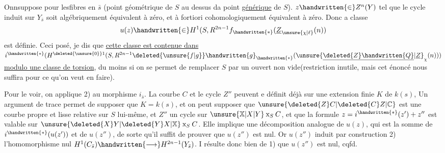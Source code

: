 Onnsuppose   pour lesfibres en $\bar s$ (point géométrique  de $S$ au dessus da point \uline{générique} de $S$).    $z\handwritten{\in}Z^n(Y)$ tel que le cycle induit sur $Y_{\bar s}$ soit algébriquement équivalent à zéro, et à fortiori cohomologiquement équivalent à zéro. Donc a classe
\[
u(z)\handwritten{\in}H^1(S,R^{2n-1}f_{\handwritten{*}}(\underline{Z}_{\unsure{\chi|\ell}}(n))
\]
est définie. Ceci posé, je dis que \uline{cette classe est  contenue dans} $i^{\handwritten{*}}(H^{\deleted{\unsure{0}}1}(S,R^{2n-1}\deleted{\unsure{f|g}}\handwritten{g}_{\handwritten{*}}(\unsure{\underline{\deleted{Z}\handwritten{Q}}|\underline{Z}}_{\chi}(n)))$ \uline{modulo une classe de torsion}, du moins si on    se permet de remplacer $S$ par un ouvert non vide(restriction  inutile, mais cet énoncé nous suffira pour ce qu'on veut en faire).

Pour le voir, on applique 2) au morphisme $i_{\bar s}$. La courbe $C$ et le cycle $Z''$ peuvent e définit déjà sur une extension finie $K$ de $k(s)$, Un argument de trace permet de supposer que $K=k(s)$, et  on peut supposer que $\unsure{\deleted{Z}C|\deleted{C}Z|\mathbb{C}}$  est une courbe propre et lisse relative sur $S$ lui-même, et $Z''$ un cycle sur $\unsure{\mathbb{X}|X|Y}\mathbin{\mathrm{x}}_S C$,  et que la formule $z=i^{\handwritten{*}}(z')+z''$ est valable sur $\unsure{\deleted{X}Y|\deleted{Y}X|\mathbb{X}}\mathbin{\mathrm{x}}_S C$. Elle implique une décomposition analogue de $u(z)$, qui est la somme de $i^{\handwritten{*}}(u(z'))$ et de $u(z'')$, de sorte qu'il suffit de prouver que $u(z'')$ est nul. Or $u(z'')$ induit par construction 2) l'homomorphisme nul $H^1(C_{\bar s})\handwritten{\longrightarrow}H^{2n-1}(Y_{\bar s})$. I résulte donc bien de 1) que $u(z'')$ est nul, cqfd.

